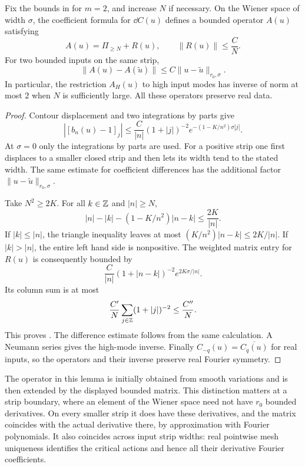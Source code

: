 \begin{lemma}\label{ana:wiener-estimate}
Fix the bounds in  for \(m=2\),
and increase \(N\) if necessary.  On the Wiener space of width
\(\sigma\), the coefficient formula for \(\dd C(u)\) defines a
bounded operator \(A(u)\) satisfying
\begin{equation}\label{ana:wiener-near-identity}
A(u)=\Pi_{\ge N}+R(u),\qquad \|R(u)\|\le\frac{C}{N}.
\end{equation}
For two bounded inputs on the same strip,
\begin{equation}\label{ana:wiener-lipschitz}
\|A(u)-A(\widetilde u)\|
\le C\|u-\widetilde u\|_{r_0,\sigma}.
\end{equation}
In particular, the restriction \(A_H(u)\) to high input modes has
inverse of norm at most \(2\) when \(N\) is sufficiently large.
All these operators preserve real data.
\end{lemma}

\begin{proof}
Contour displacement and two integrations by parts give
\[
|[b_n(u)-1]_j|
\le\frac{C}{|n|}(1+|j|)^{-2}
 e^{-(1-K/n^2)\sigma|j|}.
\]
At \(\sigma=0\) only the integrations by parts are used.
For a positive strip one first displaces to a smaller closed strip
and then lets its width tend to the stated width.
The same estimate for coefficient differences has the additional
factor \(\|u-\widetilde u\|_{r_0,\sigma}\).

Take \(N^2\ge 2K\).  For all \(k\in\mathbb Z\) and \(|n|\ge N\),
\begin{equation}\label{ana:exponential-balance}
|n|-|k|-(1-K/n^2)|n-k|\le\frac{2K}{|n|}.
\end{equation}
If \(|k|\le|n|\), the triangle inequality leaves at most
\((K/n^2)|n-k|\le2K/|n|\).  If \(|k|>|n|\), the entire left hand
side is nonpositive.
The weighted matrix entry for \(R(u)\) is consequently bounded by
\[
\frac{C}{|n|}(1+|n-k|)^{-2}e^{2K\sigma/|n|}.
\]
Its column sum is at most
\[
\frac{C'}N\sum_{j\in\mathbb Z}(1+|j|)^{-2}\le\frac{C''}N.
\]
This proves .  The difference estimate
follows from the same calculation.  A Neumann series gives the
high-mode inverse.  Finally \(C_{-q}(u)=\overline{C_q(u)}\) for real
inputs, so the operators and their inverse preserve real Fourier
symmetry.
\end{proof}

The operator in this lemma is initially obtained from smooth
variations and is then extended by the displayed bounded matrix.
This distinction matters at a strip boundary, where an element of
the Wiener space need not have \(r_0\) bounded derivatives.
On every smaller strip it does have these derivatives, and the
matrix coincides with the actual derivative there, by approximation
with Fourier polynomials.  It also coincides across input strip
widths: real pointwise mesh uniqueness identifies the critical actions
and hence all their derivative Fourier coefficients.

